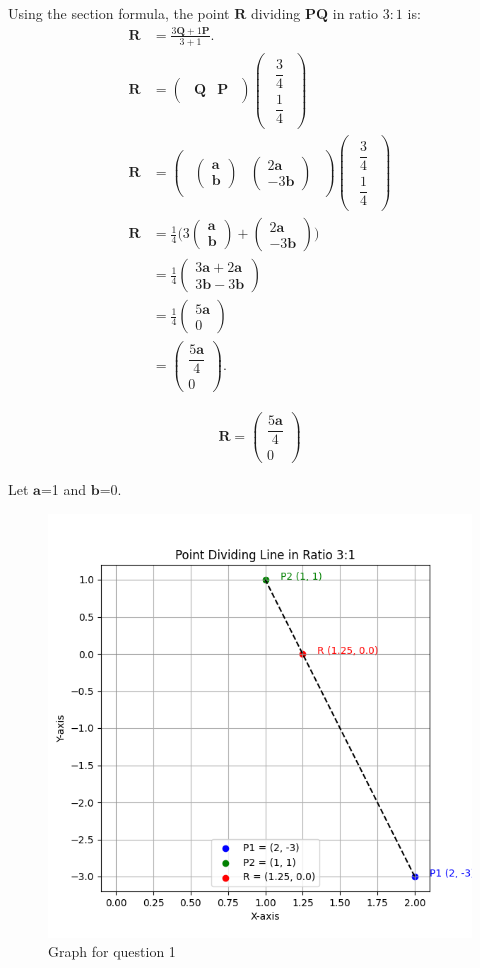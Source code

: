 \documentclass[journal]{IEEEtran}
\renewcommand{\vec}[1]{\mathbf{#1}}
\newcommand{\brak}[1]{\begin{pmatrix}#1\end{pmatrix}}
\begin{document}
Using the section formula, the point $\vec{R}$ dividing $\vec{PQ}$ in ratio $3:1$ is:
\begin{align}
\vec{R} &= \frac{3\vec{Q} + 1\vec{P}}{3+1}. \\[6pt]
\vec{R} &= \brak{\begin{matrix}\vec{Q} & \vec{P}\end{matrix}}
          \brak{\begin{matrix}\dfrac{3}{4} \\[6pt]\dfrac{1}{4}\end{matrix}} \\[6pt]
\vec{R} &= \brak{\begin{matrix}\brak{\vec{a} \\ \vec{b}} & \brak{2\vec{a} \\ -3\vec{b}}\end{matrix}}
          \brak{\begin{matrix}\dfrac{3}{4} \\[6pt]\dfrac{1}{4}\end{matrix}} \\[6pt]
\vec{R} &= \frac{1}{4}\Big(3\brak{\vec{a} \\ \vec{b}} + \brak{2\vec{a} \\ -3\vec{b}}\Big) \\[6pt]
&= \frac{1}{4}\brak{3\vec{a}+2\vec{a} \\ 3\vec{b}-3\vec{b}} \\[6pt]
&= \frac{1}{4}\brak{5\vec{a} \\ 0} \\[6pt]
&= \brak{\dfrac{5\vec{a}}{4} \\ 0}.
\end{align}

\begin{align}
\boxed{\,\vec{R} = \brak{\dfrac{5\vec{a}}{4} \\ 0}\,}
\end{align}

Let $\vec{a}$=1 and $\vec{b}$=0.

\begin{figure}[ht!]
\centering
\includegraphics[height=0.5\textheight, keepaspectratio]{figs/q1.png}
\caption{Graph for question 1}
\end{figure}
\end{document}
